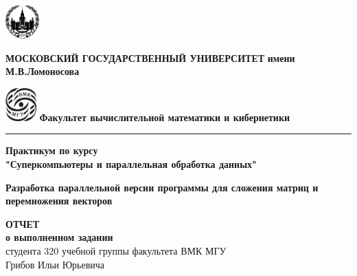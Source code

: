 \documentclass{article}
\begin{document}
\begin{titlepage}
      
\end{titlepage}

\begin{titlepage}
	\begin{center}
	\includegraphics[height=0.5in]{msu.png}
	\hfill
	\begin{minipage}[b]{0.77\textwidth}
		\centering
		\textbf{\fontsize{12}{9}\selectfont МОСКОВСКИЙ ГОСУДАРСТВЕННЫЙ УНИВЕРСИТЕТ}
		\bigbreak
		\textbf{\fontsize{12}{9}\selectfont имени М.В.Ломоносова}
	\end{minipage}
	\hfill
	\includegraphics[height=0.5in]{vmk.png}
	\bigbreak
	\textbf{\fontsize{12}{9}\selectfont Факультет вычислительной математики и кибернетики}
	\end{center}
	\vspace{-0.1cm}
	\hrule
	
	\vspace{5cm}
	\begin{center}
	{\fontsize{16}{30}\selectfont 
	\bf Практикум по курсу\\
	"Суперкомпьютеры и параллельная обработка данных"\\
	}
	
	\fontsize{12}{30}\selectfont\bf {Разработка параллельной версии программы для сложения матриц и перемножения векторов
	}
				
	\vspace{2cm}
	
	{\fontsize{16}{30}\selectfont 
	\textbf{ОТЧЕТ\\
	о выполненном задании\\}
	студента 320 учебной группы факультета ВМК МГУ\\
	Грибов Ильи Юрьевича\\}
	\end{center}
	
	\vfill
\end{titlepage}

\tableofcontents
\end{document}
